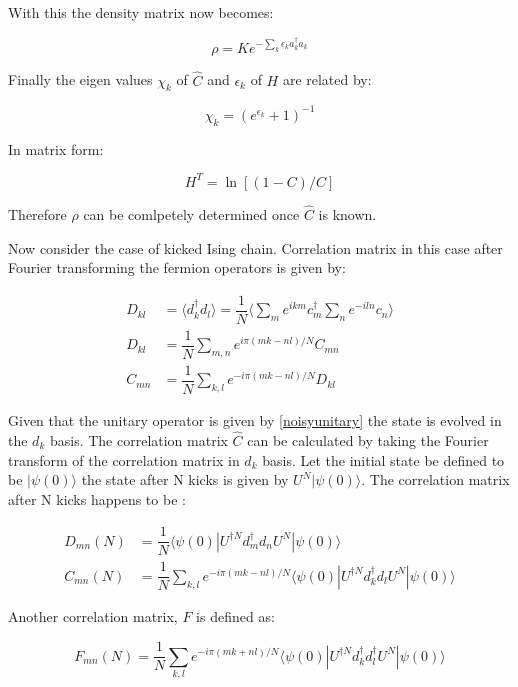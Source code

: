 \documentclass[11pt,a4paper]{article}
\begin{document}
With this the density matrix now becomes:

\begin{equation}
\rho = K e^{-\sum_{k}\epsilon_{k}a_{k}^\dagger a_{k}}
\end{equation}

Finally the eigen values $\chi_{k}$ of $\hat{C}$ and $\epsilon_{k}$ of $H$ are related by:

\begin{equation}
\chi_{k}  =(e^{\epsilon_{k}} +1)^{-1}
\end{equation}

In matrix form:

\begin{equation}
H^T = \ln [(1-C)/C]
\end{equation}
		
		Therefore $\rho $ can be comlpetely determined once $\hat{C}$ is known. 
	
Now consider the case of kicked Ising chain. Correlation matrix in this case after Fourier transforming the fermion operators is given by: 
		
		\begin{align}
		D_{kl} &= \langle d_{k}^\dagger d_{l} \rangle =\dfrac{1}{N} \langle \sum_{m} e^{ikm} c_{m}^\dagger\sum_{n} e^{-iln}c_{n}\rangle \\
		D_{kl} &= \dfrac{1}{N}\sum_{m,n} e^{i\pi(mk-nl)/N}C_{mn}\\
		C_{mn}&=  \dfrac{1}{N}\sum_{k,l} e^{-i\pi(mk-nl)/N}D_{kl}
		\end{align}
		
		Given that the unitary operator is given by \ref{noisyunitary} the state is evolved in the $d_{k}$ basis. The correlation matrix $\hat{C}$ can be calculated by taking the Fourier transform of the correlation matrix in $d_{k}$ basis. 
Let the initial state be defined to be $|\psi(0)\rangle$ the state after N kicks is given by $U^N |\psi(0)\rangle$. The correlation matrix after N kicks happens to be :

\begin{align}
D_{mn}(N) &= \dfrac{1}{N} \langle \psi(0)|U^{\dagger N} d_{m}^\dagger d_{n}  U^{ N}| \psi(0)\rangle\\
C_{mn}(N) &= \dfrac{1}{N} \sum_{k,l} e^{-i\pi(mk-nl)/N} \langle \psi(0)|U^{\dagger N} d_{k}^\dagger d_{l}  U^{ N}| \psi(0)\rangle
\end{align}		


Another correlation matrix, $ F $ is defined as:

\begin{equation}\label{key}
F_{mn}(N) = \dfrac{1}{N} \sum_{k,l} e^{-i\pi(mk+nl)/N} \langle \psi(0)|U^{\dagger N} d_{k}^\dagger d_{l}^\dagger  U^{ N}| \psi(0)\rangle
\end{equation}
\end{document}
